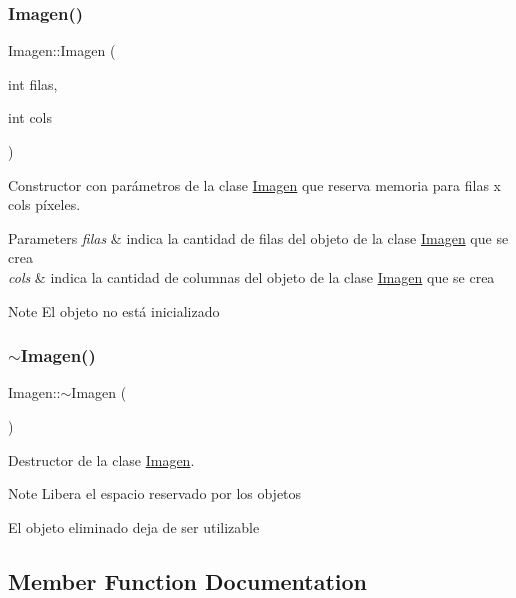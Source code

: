\subsubsection{\texorpdfstring{Imagen()}{Imagen()}\hspace{0.1cm}{\footnotesize\ttfamily [3/3]}}
{\footnotesize\ttfamily Imagen\+::\+Imagen (\begin{DoxyParamCaption}\item[{int}]{filas,  }\item[{int}]{cols }\end{DoxyParamCaption})}



Constructor con parámetros de la clase \hyperlink{classImagen}{Imagen} que reserva memoria para filas x cols píxeles. 


\begin{DoxyParams}{Parameters}
{\em filas} & indica la cantidad de filas del objeto de la clase \hyperlink{classImagen}{Imagen} que se crea \\
\hline
{\em cols} & indica la cantidad de columnas del objeto de la clase \hyperlink{classImagen}{Imagen} que se crea \\
\hline
\end{DoxyParams}
\begin{DoxyNote}{Note}
El objeto no está inicializado 
\end{DoxyNote}
\mbox{\label{classImagen_a03dd93c9cf920a9dc0b72f8bd34f2e8a}} 
\subsubsection{\texorpdfstring{$\sim$\+Imagen()}{~Imagen()}}
{\footnotesize\ttfamily Imagen\+::$\sim$\+Imagen (\begin{DoxyParamCaption}{ }\end{DoxyParamCaption})}



Destructor de la clase \hyperlink{classImagen}{Imagen}. 

\begin{DoxyNote}{Note}
Libera el espacio reservado por los objetos 

El objeto eliminado deja de ser utilizable 
\end{DoxyNote}


\subsection{Member Function Documentation}
\mbox{\label{classImagen_a3831ed1e6fc85a192a0122eaa31e54cb}} 
